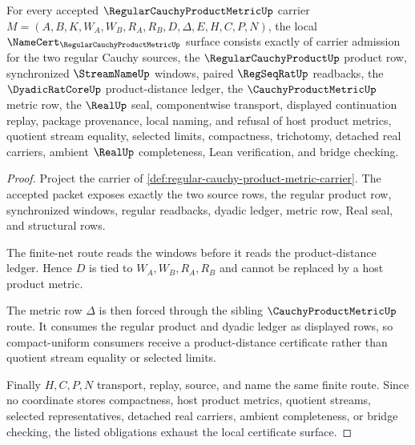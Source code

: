 \begin{theorem}
\label{thm:regular-cauchy-product-metric-namecert-obligations}
For every accepted $\RegularCauchyProductMetricUp$ carrier $M=(A,B,K,W_A,W_B,R_A,R_B,D,\Delta,E,H,C,P,N)$, the local $\NameCert_{\RegularCauchyProductMetricUp}$ surface consists exactly of carrier admission for the two regular Cauchy sources, the $\RegularCauchyProductUp$ product row, synchronized $\StreamNameUp$ windows, paired $\RegSeqRatUp$ readbacks, the $\DyadicRatCoreUp$ product-distance ledger, the $\CauchyProductMetricUp$ metric row, the $\RealUp$ seal, componentwise transport, displayed continuation replay, package provenance, local naming, and refusal of host product metrics, quotient stream equality, selected limits, compactness, trichotomy, detached real carriers, ambient $\RealUp$ completeness, Lean verification, and bridge checking.
\end{theorem}
\begin{proof}
Project the carrier of \autoref{def:regular-cauchy-product-metric-carrier}. The accepted packet exposes exactly the two source rows, the regular product row, synchronized windows, regular readbacks, dyadic ledger, metric row, Real seal, and structural rows.

The finite-net route reads the windows before it reads the product-distance ledger. Hence $D$ is tied to $W_A,W_B,R_A,R_B$ and cannot be replaced by a host product metric.

The metric row $\Delta$ is then forced through the sibling $\CauchyProductMetricUp$ route. It consumes the regular product and dyadic ledger as displayed rows, so compact-uniform consumers receive a product-distance certificate rather than quotient stream equality or selected limits.

Finally $H,C,P,N$ transport, replay, source, and name the same finite route. Since no coordinate stores compactness, host product metrics, quotient streams, selected representatives, detached real carriers, ambient completeness, or bridge checking, the listed obligations exhaust the local certificate surface.
\end{proof}


